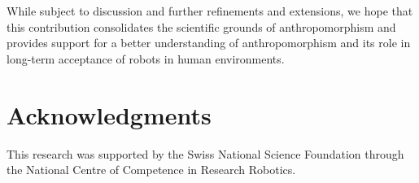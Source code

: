 \documentclass{frontiersSCNS} %
\begin{document}
While subject to discussion and further refinements and extensions, we hope that this contribution consolidates the scientific grounds of anthropomorphism and provides support for a better understanding of anthropomorphism and its role in long-term acceptance of robots in human environments.



\section*{Acknowledgments}
This research was supported by the Swiss National Science Foundation through the National Centre of Competence in Research Robotics.










\end{document}
